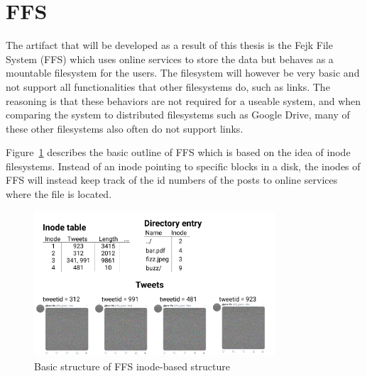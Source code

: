 \section{FFS}
The artifact that will be developed as a result of this thesis is the Fejk File System (FFS) which uses online services to store the data but behaves as a mountable filesystem for the users. The filesystem will however be very basic and not support all functionalities that other filesystems do, such as links. The reasoning is that these behaviors are not required for a useable system, and when comparing the system to distributed filesystems such as Google Drive, many of these other filesystems also often do not support links.

Figure~\ref{fig:ffs_inode_diag} describes the basic outline of FFS which is based on the idea of inode filesystems. Instead of an inode pointing to specific blocks in a disk, the inodes of FFS will instead keep track of the id numbers of the posts to online services where the file is located. 

\begin{figure}[!ht]
	\begin{center}
	  \includegraphics[width=0.8\textwidth]{figures/ffs_inode_diagram.png}
	\end{center}
	\caption{Basic structure of FFS inode-based structure}
	\label{fig:ffs_inode_diag}
\end{figure}

